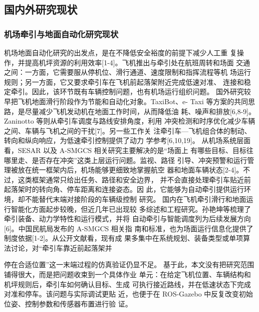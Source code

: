 \subsection{国内外研究现状}
\subsubsection{机场牵引与地面自动化研究现状}
机场地面自动化研究的出发点，是在不降低安全裕度的前提下减少人工重
复操作，并提高机坪资源的利用效率[1-4]。飞机推出与牵引处在航班周转和场面
交通之间：一方面，它需要服从停机位、滑行通道、速度限制和指挥流程等机
场运行规则；另一方面，它又要求牵引车在飞机前起落架附近完成低速对准、
连接和稳定牵引。因此，该环节既有车辆控制问题，也有机场运行组织问题。
国外研究较早把飞机地面滑行阶段作为节能和自动化对象。TaxiBot、e-
Taxi 等方案的共同思路，是尽量减少飞机发动机在地面工作时间，从而降低油
耗、噪声和排放[6,8-9]。Zaninotto 等则从牵引车调度与路线安排角度，利用
冲突检测和时序优化减少车辆之间、车辆与飞机之间的干扰[7]。另一些工作关
注牵引车—飞机组合体的制动、转向和纵向响应，为低速牵引控制提供了动力
学参考[6,10,19]。
从机场系统层面看，SESAR 以及 A-SMGCS 相关研究主要解决的是“场面上
有哪些目标、目标往哪里走、是否存在冲突”这类上层运行问题。监视、路径
引导、冲突预警和运行管理被放在统一框架内后，机场能够更细致地掌握航空
器和地面车辆状态[2-4]。不过，这类框架通常只给出任务、路径和安全边界，
并不会直接处理牵引车贴近前起落架时的转向角、停车距离和连接姿态。因
此，它能够为自动牵引提供运行环境，却不能替代末端对接阶段的车辆级控制
研究。
国内在飞机牵引滑行和地面运行智能化方面起步较晚，但近几年已出现较
多综述和工程研究。孙艳坤等梳理了牵引装备、动力学特性和运行模式，并将
自动牵引与智能调度列为后续发展方向[6]。中国民航局发布的 A-SMGCS 相关指
南和标准，也为场面运行信息化提供了制度依据[1-2]。从公开文献看，现有成
果多集中在系统规划、装备类型或单项算法讨论，对“牵引车靠近前起落架并







停在合适位置”这一末端过程的仿真验证仍显不足。
基于此，本文没有把研究范围铺得很大，而是把问题收束到一个具体作业
单元：在给定飞机位置、车辆结构和机坪规则后，牵引车如何确认目标、生成
可执行接近路线，并在低速状态下完成对准和停车。该问题与实际调试更贴
近，也便于在 ROS-Gazebo 中反复改变初始位姿、控制参数和传感器布置进行验
证。
